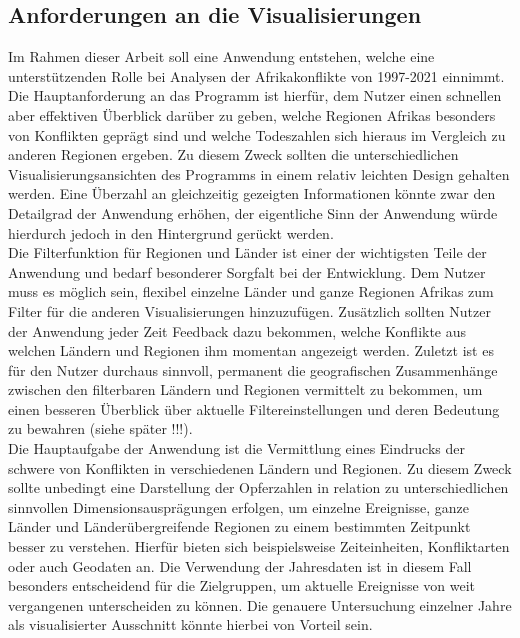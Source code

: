 \documentclass[usegeometry=true]{scrartcl}
\begin{document}
\subsection{Anforderungen an die Visualisierungen}
Im Rahmen dieser Arbeit soll eine Anwendung entstehen, welche eine unterstützenden Rolle bei Analysen der Afrikakonflikte von 1997-2021 einnimmt. Die Hauptanforderung an das Programm ist hierfür, dem Nutzer einen schnellen aber effektiven Überblick darüber zu geben, welche Regionen Afrikas besonders von Konflikten geprägt sind und welche Todeszahlen sich hieraus im Vergleich zu anderen Regionen ergeben. Zu diesem Zweck sollten die unterschiedlichen Visualisierungsansichten des Programms in einem relativ \glqq leichten\grqq{} Design gehalten werden. Eine Überzahl an gleichzeitig gezeigten Informationen könnte zwar den Detailgrad der Anwendung erhöhen, der eigentliche Sinn der Anwendung würde hierdurch jedoch in den Hintergrund gerückt werden.\\ Die Filterfunktion für Regionen und Länder ist einer der wichtigsten Teile der Anwendung und bedarf besonderer Sorgfalt bei der Entwicklung. Dem Nutzer muss es möglich sein, flexibel einzelne Länder und ganze Regionen Afrikas zum Filter für die anderen Visualisierungen hinzuzufügen. Zusätzlich sollten Nutzer der Anwendung jeder Zeit Feedback dazu bekommen, welche Konflikte aus welchen Ländern und Regionen ihm momentan angezeigt werden. Zuletzt ist es für den Nutzer durchaus sinnvoll, permanent die geografischen Zusammenhänge zwischen den filterbaren Ländern und Regionen vermittelt zu bekommen, um einen besseren Überblick über aktuelle Filtereinstellungen und deren Bedeutung zu bewahren (siehe später !!!).\\ Die Hauptaufgabe der Anwendung ist die Vermittlung eines Eindrucks der schwere von Konflikten in verschiedenen Ländern und Regionen. Zu diesem Zweck sollte unbedingt eine Darstellung der Opferzahlen in relation zu unterschiedlichen sinnvollen Dimensionsausprägungen erfolgen, um einzelne Ereignisse, ganze Länder und Länderübergreifende Regionen zu einem bestimmten Zeitpunkt besser zu verstehen. Hierfür bieten sich beispielsweise Zeiteinheiten, Konfliktarten oder auch Geodaten an. Die Verwendung der Jahresdaten ist in diesem Fall besonders entscheidend für die Zielgruppen, um aktuelle Ereignisse von weit vergangenen unterscheiden zu können. Die genauere Untersuchung einzelner Jahre als \glqq visualisierter Ausschnitt\grqq{} könnte hierbei von Vorteil sein.\\
\end{document}
